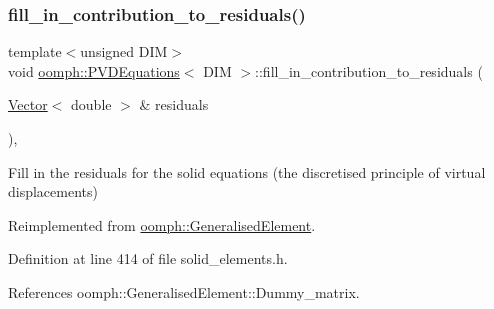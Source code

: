 \subsubsection{\texorpdfstring{fill\+\_\+in\+\_\+contribution\+\_\+to\+\_\+residuals()}{fill\_in\_contribution\_to\_residuals()}}
{\footnotesize\ttfamily template$<$unsigned D\+IM$>$ \\
void \hyperlink{classoomph_1_1PVDEquations}{oomph\+::\+P\+V\+D\+Equations}$<$ D\+IM $>$\+::fill\+\_\+in\+\_\+contribution\+\_\+to\+\_\+residuals (\begin{DoxyParamCaption}\item[{\hyperlink{classoomph_1_1Vector}{Vector}$<$ double $>$ \&}]{residuals }\end{DoxyParamCaption})\hspace{0.3cm}{\ttfamily [inline]}, {\ttfamily [virtual]}}



Fill in the residuals for the solid equations (the discretised principle of virtual displacements) 



Reimplemented from \hyperlink{classoomph_1_1GeneralisedElement_a310c97f515e8504a48179c0e72c550d7}{oomph\+::\+Generalised\+Element}.



Definition at line 414 of file solid\+\_\+elements.\+h.



References oomph\+::\+Generalised\+Element\+::\+Dummy\+\_\+matrix.

\mbox{\label{classoomph_1_1PVDEquations_a2e169e572d3715f08e571cb29779a754}} 
